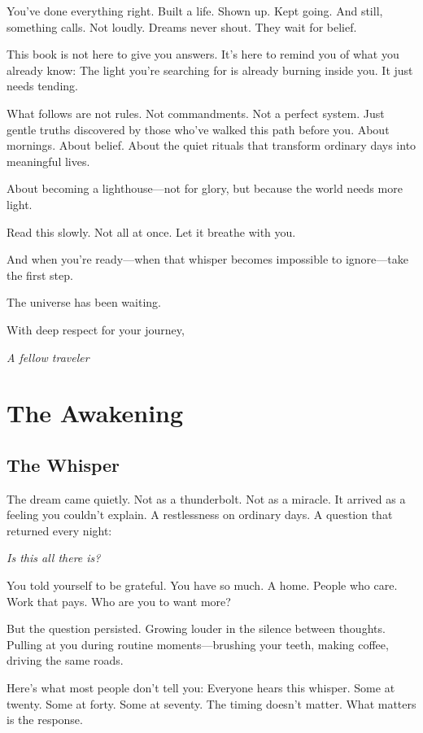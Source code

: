 \documentclass[11pt, a5paper, openright]{book}
\begin{document}
You've done everything right. Built a life. Shown up. Kept going. And still, something calls. Not loudly. Dreams never shout. They wait for belief.

This book is not here to give you answers. It's here to remind you of what you already know: The light you're searching for is already burning inside you. It just needs tending.

What follows are not rules. Not commandments. Not a perfect system. Just gentle truths discovered by those who've walked this path before you. About mornings. About belief. About the quiet rituals that transform ordinary days into meaningful lives.

About becoming a lighthouse—not for glory, but because the world needs more light.

Read this slowly. Not all at once. Let it breathe with you.

And when you're ready—when that whisper becomes impossible to ignore—take the first step.

The universe has been waiting.

With deep respect for your journey,

\textit{A fellow traveler}

\mainmatter

\part{The Awakening}

\chapter{The Whisper}

The dream came quietly. Not as a thunderbolt. Not as a miracle. It arrived as a feeling you couldn't explain. A restlessness on ordinary days. A question that returned every night:

\textit{Is this all there is?}

You told yourself to be grateful. You have so much. A home. People who care. Work that pays. Who are you to want more?

But the question persisted. Growing louder in the silence between thoughts. Pulling at you during routine moments—brushing your teeth, making coffee, driving the same roads.

Here's what most people don't tell you: Everyone hears this whisper. Some at twenty. Some at forty. Some at seventy. The timing doesn't matter. What matters is the response.
\end{document}
